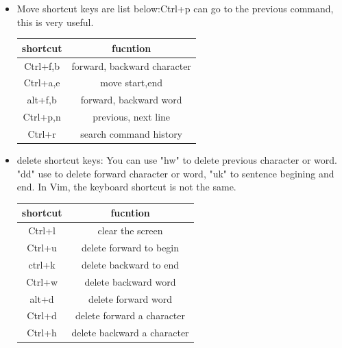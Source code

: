 \documentclass[a4paper,12pt,twoside]{book}
\begin{document}
 \begin{itemize}
  \item Move shortcut keys are list below:Ctrl+p can go to the previous command, this is very useful. 
\begin{center}
  \begin{tabular}{c|c}
 \hline shortcut & fucntion \\
\hline Ctrl+f,b & forward, backward character \\
\hline Ctrl+a,e & move start,end \\
\hline alt+f,b & forward, backward word \\
\hline Ctrl+p,n & previous, next line \\
\hline Ctrl+r & search command history \\
 \hline
  \end{tabular}
\end{center}

\item delete shortcut keys: You can use "hw" to delete previous character or word. "dd" use to delete forward character or word, "uk" to sentence begining and end. In Vim, the keyboard shortcut is not the same. 
\begin{center}
  \begin{tabular}{|c|c|}
 \hline shortcut & fucntion \\
 \hline Ctrl+l & clear the screen \\	
\hline Ctrl+u & delete forward to begin\\
\hline ctrl+k & delete backward to end \\
\hline Ctrl+w & delete backward word\\
\hline alt+d & delete forward word \\
\hline Ctrl+d & delete forward a character  \\
\hline Ctrl+h & delete backward a character  \\
 \hline
  \end{tabular}
\end{center}


\end{itemize}
\end{document}

